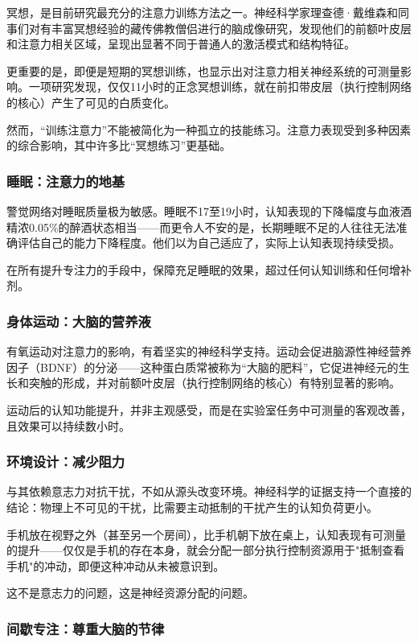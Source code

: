 \documentclass[11pt]{article}
\begin{document}
冥想，是目前研究最充分的注意力训练方法之一。神经科学家理查德·戴维森和同事们对有丰富冥想经验的藏传佛教僧侣进行的脑成像研究，发现他们的前额叶皮层和注意力相关区域，呈现出显著不同于普通人的激活模式和结构特征。

更重要的是，即便是短期的冥想训练，也显示出对注意力相关神经系统的可测量影响。一项研究发现，仅仅11小时的正念冥想训练，就在前扣带皮层（执行控制网络的核心）产生了可见的白质变化。

然而，“训练注意力”不能被简化为一种孤立的技能练习。注意力表现受到多种因素的综合影响，其中许多比“冥想练习”更基础。
\subsubsection{睡眠：注意力的地基}
\label{sec:org45d9ab0}

警觉网络对睡眠质量极为敏感。睡眠不17至19小时，认知表现的下降幅度与血液酒精浓0.05\%的醉酒状态相当——而更令人不安的是，长期睡眠不足的人往往无法准确评估自己的能力下降程度。他们以为自己适应了，实际上认知表现持续受损。

在所有提升专注力的手段中，保障充足睡眠的效果，超过任何认知训练和任何增补剂。
\subsubsection{身体运动：大脑的营养液}
\label{sec:org48e7e07}

有氧运动对注意力的影响，有着坚实的神经科学支持。运动会促进脑源性神经营养因子（BDNF）的分泌——这种蛋白质常被称为“大脑的肥料”，它促进神经元的生长和突触的形成，并对前额叶皮层（执行控制网络的核心）有特别显著的影响。

运动后的认知功能提升，并非主观感受，而是在实验室任务中可测量的客观改善，且效果可以持续数小时。
\subsubsection{环境设计：减少阻力}
\label{sec:orgee326da}

与其依赖意志力对抗干扰，不如从源头改变环境。神经科学的证据支持一个直接的结论：物理上不可见的干扰，比需要主动抵制的干扰产生的认知负荷更小。

手机放在视野之外（甚至另一个房间），比手机朝下放在桌上，认知表现有可测量的提升——仅仅是手机的存在本身，就会分配一部分执行控制资源用于"抵制查看手机"的冲动，即便这种冲动从未被意识到。

这不是意志力的问题，这是神经资源分配的问题。
\subsubsection{间歇专注：尊重大脑的节律}
\label{sec:org6497471}
\end{document}
